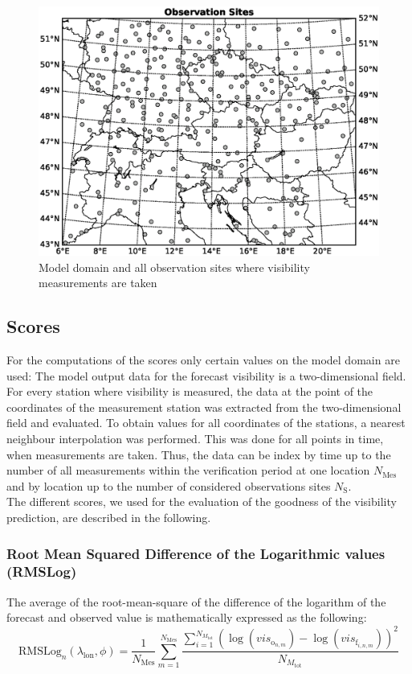 \begin{figure}[h]
    \includegraphics[width=\textwidth ] {graphics/Observation_Sites.eps}
    \caption[Map of Observation Sites]{Model domain and all observation sites where visibility measurements are taken}
    \label{fig:stations}
\end{figure}
 
\subsection{Scores}
For the computations of the scores only certain values on the model domain are used: The model output data for the forecast visibility is a two-dimensional field. For every station where visibility is measured, the data at the point of the coordinates of the measurement station was extracted from the two-dimensional field and evaluated. To obtain values for all coordinates of the stations, a nearest neighbour interpolation was performed. This was done for all points in time, when measurements are taken. Thus, the data can be index by time up to the number of all measurements within the verification period at one location $N_\mathrm{Mes}$ and by location up to the number of considered observations sites $N_\mathrm{S}$. \\
The different scores, we used for the evaluation of the goodness of the visibility prediction, are described in the following.\\

\subsubsection{Root Mean Squared Difference of the Logarithmic values (RMSLog) }
The average of the root-mean-square of the difference of the logarithm of the forecast and observed value is mathematically expressed as the following:
\begin{equation}
    \mathrm{RMSLog}_{n}(\lambda_{\mathrm{lon}}, \phi) =  \frac{1}{N_\mathrm{Mes}}\sum_{m=1}^{N_\mathrm{{Mes}}} \frac{ \sum_{i=1}^{N_{M_\mathrm{{tot}}}} (\log(vis_{\mathrm{o}_{n,m}}) - \log(vis_{\mathrm{f}_{i,n,m}}))^{2}} {N_{M_\mathrm{{tot}}}}
    \label{eq:haselstonerscore_loc}
\end{equation}


